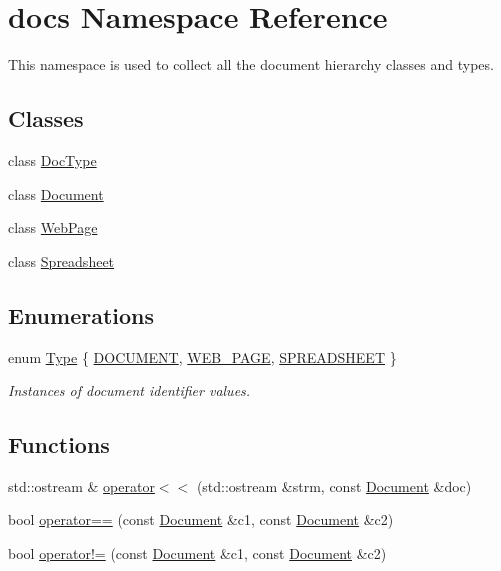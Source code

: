 \hypertarget{namespacedocs}{\section{docs Namespace Reference}
\label{namespacedocs}
}


This namespace is used to collect all the document hierarchy classes and types.  


\subsection*{Classes}
\begin{DoxyCompactItemize}
\item 
class \hyperlink{classdocs_1_1DocType}{Doc\-Type}
\item 
class \hyperlink{classdocs_1_1Document}{Document}
\item 
class \hyperlink{classdocs_1_1WebPage}{Web\-Page}
\item 
class \hyperlink{classdocs_1_1Spreadsheet}{Spreadsheet}
\end{DoxyCompactItemize}
\subsection*{Enumerations}
\begin{DoxyCompactItemize}
\item 
enum \hyperlink{namespacedocs_a150efca62822b8ab62a5afabe299bf75}{Type} \{ \hyperlink{namespacedocs_a150efca62822b8ab62a5afabe299bf75ab5b85a2de45c75c8eb58ccb377a01543}{D\-O\-C\-U\-M\-E\-N\-T}, 
\hyperlink{namespacedocs_a150efca62822b8ab62a5afabe299bf75a1660685efab992a33bb802d68b4e8c13}{W\-E\-B\-\_\-\-P\-A\-G\-E}, 
\hyperlink{namespacedocs_a150efca62822b8ab62a5afabe299bf75a7c469773c8012b650a4db4d9f46e343a}{S\-P\-R\-E\-A\-D\-S\-H\-E\-E\-T}
 \}
\begin{DoxyCompactList}\small\item\em Instances of document identifier values. \end{DoxyCompactList}\end{DoxyCompactItemize}
\subsection*{Functions}
\begin{DoxyCompactItemize}
\item 
std\-::ostream \& \hyperlink{namespacedocs_a2464f4b0ad981aa2f4f4f56dd16afb18}{operator$<$$<$} (std\-::ostream \&strm, const \hyperlink{classdocs_1_1Document}{Document} \&doc)
\item 
bool \hyperlink{namespacedocs_a69ecd221cb71a7f629bf48b283aefbc2}{operator==} (const \hyperlink{classdocs_1_1Document}{Document} \&c1, const \hyperlink{classdocs_1_1Document}{Document} \&c2)
\item 
bool \hyperlink{namespacedocs_abbb9bd3baf3e28ceb50a275bb0695e89}{operator!=} (const \hyperlink{classdocs_1_1Document}{Document} \&c1, const \hyperlink{classdocs_1_1Document}{Document} \&c2)
\end{DoxyCompactItemize}
